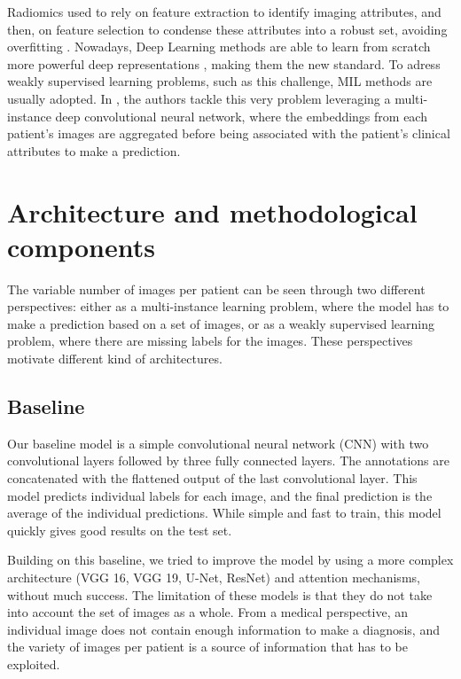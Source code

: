\documentclass{midl}
\begin{document}
Radiomics used to rely on feature extraction to identify imaging attributes, and then, on feature selection to condense these attributes into a robust set, avoiding overfitting \cite{Vial_2018}. Nowadays, Deep Learning methods are able to learn from scratch more powerful deep representations \cite{Yao_2020}, making them the new standard. To adress weakly supervised learning problems, such as this challenge, MIL methods are usually adopted. In \cite{Sahasrabudhe_2021}, the authors tackle this very problem leveraging a multi-instance deep convolutional neural network, where the embeddings from each patient's images are aggregated before being associated with the patient's clinical attributes to make a prediction.


\section{Architecture and methodological components}
\label{sec:methodology}

The variable number of images per patient can be seen through two different perspectives: either as a multi-instance learning problem, where the model has to make a prediction based on a set of images, or as a weakly supervised learning problem, where there are missing labels for the images. These perspectives motivate different kind of architectures.

\subsection{Baseline}

Our baseline model is a simple convolutional neural network (CNN) with two convolutional layers followed by three fully connected layers. The annotations are concatenated with the flattened output of the last convolutional layer. This model predicts individual labels for each image, and the final prediction is the average of the individual predictions. While simple and fast to train, this model quickly gives good results on the test set.

Building on this baseline, we tried to improve the model by using a more complex architecture (VGG 16, VGG 19, U-Net, ResNet) and attention mechanisms, without much success. The limitation of these models is that they do not take into account the set of images as a whole. From a medical perspective, an individual image does not contain enough information to make a diagnosis, and the variety of images per patient is a source of information that has to be exploited.
\end{document}
